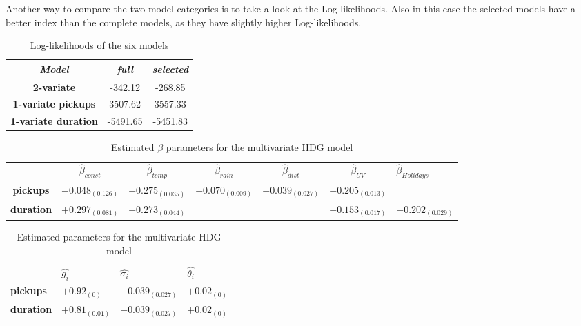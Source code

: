 Another way to compare the two model categories is to take a look at the Log-likelihoods. Also in this case the selected models have a better index than the complete models, as they have slightly higher Log-likelihoods.
\begin{table}[h!]
	\centering
	\begin{tabular}{c|c|c}
		\hline
		\textit{Model} &\textit{full } & \textit{selected} \\ 
		\hline
		\textbf{2-variate } & -342.12  & -268.85    \\ 
		\hline
		\textbf{1-variate pickups } & 3507.62  & 3557.33    \\ 
		\hline
		\textbf{1-variate duration} & -5491.65  & -5451.83   \\ 
		\hline
	\end{tabular}
	\caption{Log-likelihoods of the six models}
	\label{Log-likelihoods HDGM}
\end{table}

\begin{table}[h!]
	\centering
	\begin{tabular}{|ccccccl}
		\hline
		& $\hat{\beta}_{const}$  & $\hat{\beta}_{temp}$ & $\hat{\beta}_{rain}$ & $\hat{\beta}_{dist}$ & $\hat{\beta}_{UV}$ &$\hat{\beta}_{Holidays}$      \\ \cline{2-7} 
		\multicolumn{1}{|c|}{\textbf{pickups}}  & $-0.048_{(0.126)}$ & $+0.275_{(0.035)}$ & $-0.070_{(0.009)}$ & $+0.039_{(0.027)}$ & $+0.205_{(0.013)}$ &              \\
		\multicolumn{1}{|c|}{\textbf{duration}} & $+0.297_{(0.081)}$  & $+0.273_{(0.044)}$ &               &               & $+0.153_{(0.017)}$  & $+0.202_{(0.029)}$
	\end{tabular}
	\caption{Estimated $\beta$ parameters for the multivariate HDG model}
	\label{Bivariate Beta HDGM}
\end{table}

\begin{table}[]
	\begin{tabular}{|llll}
		\hline
		& $\hat{g_i}$  & $\hat{\sigma_i}$ & $\hat{\theta_i}$  \\ \cline{2-4} 
		\multicolumn{1}{|l|}{\textbf{pickups}}  &  $+0.92_{(0)}$ &  $+0.039_{(0.027)}$ & \multicolumn{1}{c}{$+0.02_{(0)}$ } \\
		\multicolumn{1}{|l|}{\textbf{duration}} &  $+0.81_{(0.01)}$ &  $+0.039_{(0.027)}$ &     $+0.02_{(0)}$                              
	\end{tabular}
	\caption{Estimated parameters for the multivariate HDG model}
	\label{Bivariate Param_HDGM}
\end{table}

